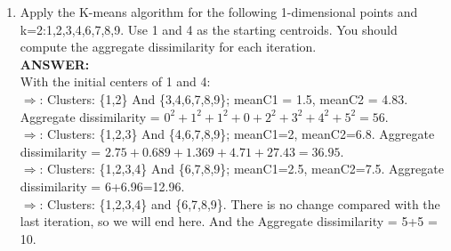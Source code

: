 \documentclass{article}
\begin{document}
\begin{enumerate}
\item Apply the K-means algorithm for the following 1-dimensional
  points and k=2:1,2,3,4,6,7,8,9. Use 1 and 4 as the starting
  centroids. You should compute the aggregate dissimilarity for each
  iteration. \\
\textbf{ANSWER:} \\
With the initial centers of 1 and 4: \\
$\Rightarrow$: Clusters: \{1,2\} And \{3,4,6,7,8,9\}; meanC1 = 1.5,
meanC2 = 4.83. Aggregate dissimilarity =
$0^2+1^2+1^2+0+2^2+3^2+4^2+5^2 = 56$. \\
$\Rightarrow$: Clusters: \{1,2,3\} And \{4,6,7,8,9\}; meanC1=2,
meanC2=6.8. Aggregate dissimilarity =
$2.75+0.689+1.369+4.71+27.43=36.95$. \\
$\Rightarrow$: Clusters: \{1,2,3,4\} And \{6,7,8,9\}; meanC1=2.5,
meanC2=7.5. Aggregate dissimilarity = 6+6.96=12.96. \\
$\Rightarrow$: Clusters: \{1,2,3,4\} and \{6,7,8,9\}. There is no change
compared with the last iteration, so we will end here. And the
Aggregate dissimilarity = 5+5 = 10. 


\end{enumerate}
\end{document}
